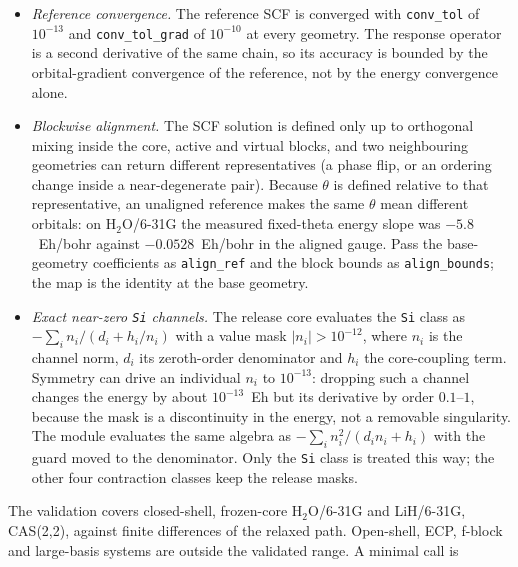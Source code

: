 \begin{itemize}
\item \emph{Reference convergence.}  The reference SCF is converged with
  \texttt{conv\_tol} of $10^{-13}$ and \texttt{conv\_tol\_grad} of
  $10^{-10}$ at every geometry.  The response operator is a second
  derivative of the same chain, so its accuracy is bounded by the
  orbital-gradient convergence of the reference, not by the energy
  convergence alone.
\item \emph{Blockwise alignment.}  The SCF solution is defined only up
  to orthogonal mixing inside the core, active and virtual blocks, and
  two neighbouring geometries can return different representatives (a
  phase flip, or an ordering change inside a near-degenerate pair).
  Because $\theta$ is defined relative to that representative, an
  unaligned reference makes the same $\theta$ mean different orbitals:
  on H$_2$O/6-31G the measured fixed-theta energy slope was
  $-5.8$~Eh/bohr against $-0.0528$~Eh/bohr in the aligned gauge.  Pass
  the base-geometry coefficients as \texttt{align\_ref} and the block
  bounds as \texttt{align\_bounds}; the map is the identity at the base
  geometry.
\item \emph{Exact near-zero \texttt{Si} channels.}  The release core
  evaluates the \texttt{Si} class as
  $-\sum_i n_i/(d_i + h_i/n_i)$ with a value mask $|n_i| > 10^{-12}$,
  where $n_i$ is the channel norm, $d_i$ its zeroth-order denominator
  and $h_i$ the core-coupling term.  Symmetry can drive an individual
  $n_i$ to $10^{-13}$: dropping such a channel changes the energy by
  about $10^{-13}$~Eh but its derivative by order $0.1$--$1$, because
  the mask is a discontinuity in the energy, not a removable
  singularity.  The module evaluates the same algebra as
  $-\sum_i n_i^2/(d_i n_i + h_i)$ with the guard moved to the
  denominator.  Only the \texttt{Si} class is treated this way; the
  other four contraction classes keep the release masks.
\end{itemize}

The validation covers closed-shell, frozen-core H$_2$O/6-31G and
LiH/6-31G, CAS(2,2), against finite differences of the relaxed path.
Open-shell, ECP, f-block and large-basis systems are outside the
validated range.  A minimal call is

